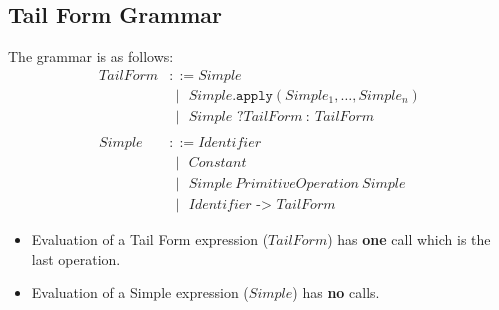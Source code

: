 \documentclass[10pt]{article}
\begin{document}
\subsection*{Tail Form Grammar}
The grammar is as follows:
\begin{align*}
TailForm &::= Simple\\
&~~| ~~~Simple\texttt{.apply}(Simple_1, \dots, Simple_n)\\
&~~| ~~~Simple \texttt{ ?} TailForm \::\: TailForm\\
\\
Simple &::= Identifier\\
&~~| ~~~Constant\\
&~~| ~~~Simple \: PrimitiveOperation \: Simple\\
&~~| ~~~Identifier \texttt{ -> } TailForm
\end{align*}
\begin{itemize}
    \item Evaluation of a Tail Form expression ($TailForm$) has \textbf{one} call which is the last operation.
    \item Evaluation of a Simple expression ($Simple$) has \textbf{no} calls.
\end{itemize}
\end{document}
